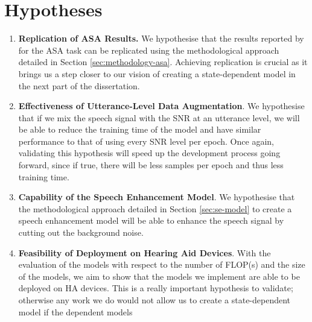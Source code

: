 \documentclass[logo,bsc,singlespacing,parskip,online]{infthesis}
\begin{document}
\section{Hypotheses}
\label{sec:hypotheses}
\begin{enumerate}
   \item \textbf{Replication of ASA Results.} 
   We hypothesise that the results reported by \citet{Huwel2020HearDS} for the ASA task can be replicated using the methodological approach detailed in Section \ref{sec:methodology-asa}.
   Achieving replication is crucial as it brings us a step closer to our vision of creating a state-dependent model in the next part of the dissertation.
   \item \textbf{Effectiveness of Utterance-Level Data Augmentation}. We hypothesise 
   that if we mix the speech signal with the SNR at an utterance level, we will be able 
   to reduce the training time of the model and have similar performance to that of using 
   every SNR level per epoch. 
   Once again, validating this hypothesis will speed up the development process going forward, 
   since if true, there will be less samples per epoch and thus less training time. 
   \item \textbf{Capability of the Speech Enhancement Model}.
   We hypothesise that the methodological approach detailed in Section \ref{sec:se-model} to 
   create a speech enhancement model will be able to enhance the speech signal by 
   cutting out the background noise. 
   \item \textbf{Feasibility of Deployment on Hearing Aid Devices}.
   With the evaluation of the models with respect to the number of FLOP(s) and the size of the models,
   we aim to show that the models we implement are able to be deployed on HA devices. 
   This is a really important hypothesis to validate; otherwise any work 
   we do would not allow us to create a state-dependent model if the dependent models 

\end{enumerate}
\end{document}
